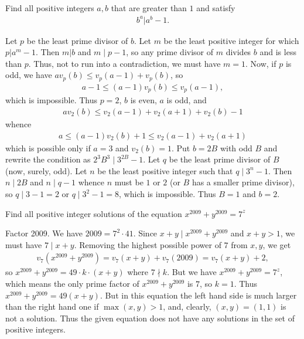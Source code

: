 \documentclass[main.tex]{subfile}
\begin{document}
    \begin{problem}
        Find all positive integers $a,b$ that are greater than $1$ and satisfy
        	\begin{align*}
	        	b^a | a^b-1.
        	\end{align*}
    \end{problem}

    \begin{solution}
        Let $p$ be the least prime divisor of $b$. Let $m$ be the least positive integer for which $p|a^m-1$. Then $m|b$ and $m\mid p-1$, so any prime divisor of $m$ divides $b$ and is less than $p$. Thus, not to run into a contradiction, we must have $m=1$. Now, if $p$ is odd, we have $av_p(b)\le v_p(a-1)+v_p(b)$, so
        	\begin{align*}
	        	a-1\le (a-1)v_p(b)\le v_p(a-1),
        	\end{align*}
        which is impossible. Thus $p=2$, $b$ is even, $a$ is odd, and
        	\begin{align*}
        		av_2(b)\le v_2(a-1)+v_2(a+1)+v_2(b)-1
        	\end{align*}
        whence
        	\begin{align*}
        		a\le (a-1)v_2(b)+1\le v_2(a-1)+v_2(a+1)
        	\end{align*}
        which is possible only if $a=3$ and $v_2(b)=1$. Put $b=2B$ with odd $B$ and rewrite the condition as $2^3B^3\mid 3^{2B}-1$. Let $q$ be the least prime divisor of $B$ (now, surely, odd). Let $n$ be the least positive integer such that $q\mid 3^n-1$. Then $n\mid 2B$ and $n\mid q-1$ whence $n$ must be $1$ or $2$ (or $B$ has a smaller prime divisor), so $q\mid 3-1=2$ or $q\mid 3^2-1=8$, which is impossible. Thus $B=1$ and $b=2$.
    \end{solution}

    \begin{problem}
        Find all positive integer solutions of the equation $ x^{2009} + y^{2009} = 7^z$
    \end{problem}

    \begin{solution}
        Factor 2009. We have $2009 = 7^2\cdot 41$. Since $x+y\mid x^{2009}+y^{2009}$ and $x+y>1$, we must have $7 \mid x+ y$. Removing the highest possible power of $7$ from $x, y$, we get
        	\begin{align*}
        		v_7(x^{2009} + y^{2009}) = v_7(x + y)+ v_7(2009) = v_7(x +y) +2,
        	\end{align*}
        so $x^{2009} + y^{2009} = 49\cdot k\cdot (x + y)$ where $7\nmid k$. But we have $x^{2009} + y^{2009} = 7^z$, which means the only prime factor of $x^{2009} + y^{2009}$ is $7$, so $k=1$. Thus $x^{2009} + y^{2009} = 49(x + y)$.  But in this equation the left hand side is much larger than the right hand one if $\max(x, y) > 1$, and, clearly, $(x, y) = (1, 1)$ is not a solution. Thus the given equation does not have any solutions in the set of positive integers.
    \end{solution}
\end{document}
